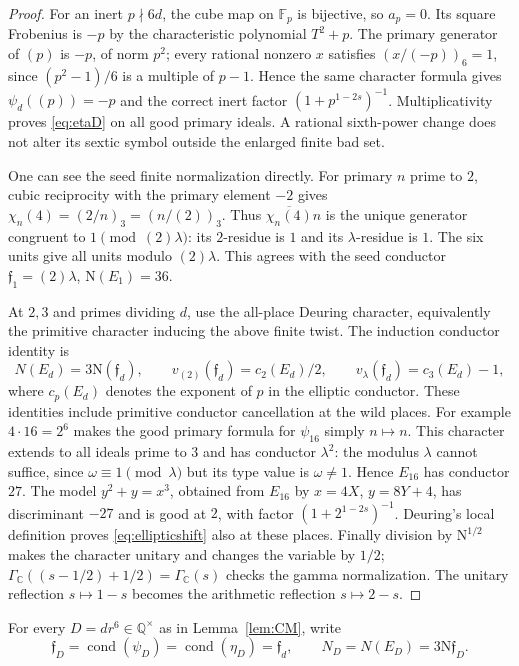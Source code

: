 \documentclass[11pt,a4paper]{article}
\numberwithin{equation}{section}
\theoremstyle{definition}
\theoremstyle{remark}
\newcommand{\Q}{\mathbb Q}
\newcommand{\C}{\mathbb C}
\newcommand{\N}{\mathrm N}
\newcommand{\GC}{\Gamma_{\C}}
\begin{document}
\begin{proof}
For an inert $p\nmid6d$, the cube map on $\mathbb F_p$ is bijective, so $a_p=0$. Its square Frobenius is $-p$ by the characteristic polynomial $T^2+p$. The primary generator of $(p)$ is $-p$, of norm $p^2$; every rational nonzero $x$ satisfies $(x/(-p))_6=1$, since $(p^2-1)/6$ is a multiple of $p-1$. Hence the same character formula gives $\psi_d((p))=-p$ and the correct inert factor $(1+p^{1-2s})^{-1}$. Multiplicativity proves \eqref{eq:etaD} on all good primary ideals. A rational sixth-power change does not alter its sextic symbol outside the enlarged finite bad set.

One can see the seed finite normalization directly. For primary $n$ prime to $2$, cubic reciprocity with the primary element $-2$ gives $\chi_n(4)=(2/n)_3=(n/(2))_3$. Thus $\overline{\chi_n(4)}n$ is the unique generator congruent to $1\pmod{(2)\lambda}$: its $2$-residue is $1$ and its $\lambda$-residue is $1$. The six units give all units modulo $(2)\lambda$. This agrees with the seed conductor $\mathfrak f_1=(2)\lambda$, $\N(E_1)=36$.

At $2,3$ and primes dividing $d$, use the all-place Deuring character, equivalently the primitive character inducing the above finite twist. The induction conductor identity is
\[
 N(E_d)=3\N(\mathfrak f_d),\qquad
 v_{(2)}(\mathfrak f_d)=c_2(E_d)/2,\qquad
 v_\lambda(\mathfrak f_d)=c_3(E_d)-1,
\]
where $c_p(E_d)$ denotes the exponent of $p$ in the elliptic conductor. These identities include primitive conductor cancellation at the wild places. For example $4\cdot16=2^6$ makes the good primary formula for $\psi_{16}$ simply $n\mapsto n$. This character extends to all ideals prime to $3$ and has conductor $\lambda^2$: the modulus $\lambda$ cannot suffice, since $\omega\equiv1\pmod\lambda$ but its type value is $\omega\ne1$. Hence $E_{16}$ has conductor $27$. The model $y^2+y=x^3$, obtained from $E_{16}$ by $x=4X$, $y=8Y+4$, has discriminant $-27$ and is good at $2$, with factor $(1+2^{1-2s})^{-1}$. Deuring's local definition proves \eqref{eq:ellipticshift} also at these places. Finally division by $\N^{1/2}$ makes the character unitary and changes the variable by $1/2$; $\GC((s-1/2)+1/2)=\GC(s)$ checks the gamma normalization. The unitary reflection $s\mapsto1-s$ becomes the arithmetic reflection $s\mapsto2-s$.
\end{proof}

For every $D=dr^6\in\Q^\times$ as in Lemma~\ref{lem:CM}, write
\[
 \mathfrak f_D=\operatorname{cond}(\psi_D)
 =\operatorname{cond}(\eta_D)=\mathfrak f_d,\qquad
 N_D=N(E_D)=3\N\mathfrak f_D.
\]
\end{document}
